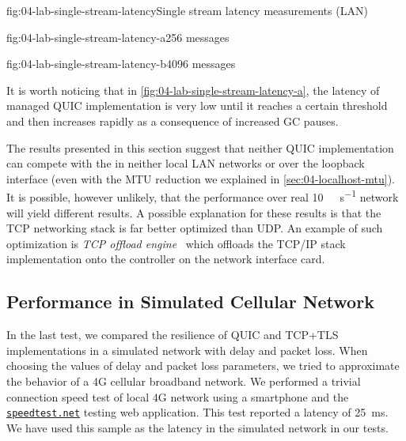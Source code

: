 \begin{myFigure}{fig:04-lab-single-stream-latency}{Single stream latency measurements (LAN)}
\begin{mySubfigure}{0.49\linewidth}{fig:04-lab-single-stream-latency-a}{\SI{256}{\byte} messages}
\footnotesize

\end{mySubfigure}
\begin{mySubfigure}{0.49\linewidth}{fig:04-lab-single-stream-latency-b}{\SI{4096}{\byte} messages}
\footnotesize

\end{mySubfigure}
\end{myFigure}

It is worth noticing that in \autoref{fig:04-lab-single-stream-latency-a}, the latency of managed QUIC
implementation is very low until it reaches a certain threshold and then increases rapidly as a
consequence of increased GC pauses.

The results presented in this section suggest that neither QUIC implementation can compete with the
\SslStream{} in neither local LAN networks or over the loopback interface (even with the MTU
reduction we explained in \autoref{sec:04-localhost-mtu}). It is possible, however unlikely, that
the performance over real \SI[per-mode=symbol]{10}{\giga\bit\per\second} network will yield
different results. A possible explanation for these results is that the TCP networking stack is far
better optimized than UDP\@. An example of such optimization is \textit{TCP offload
  engine}~\cite{wiki:tcp-offload-engine} which offloads the TCP/IP stack implementation onto the
controller on the network interface card.

\subsection{Performance in Simulated Cellular Network}

In the last test, we compared the resilience of QUIC and TCP+TLS implementations in a simulated
network with delay and packet loss. When choosing the values of delay and packet loss parameters, we
tried to approximate the behavior of a 4G cellular broadband network. We performed a trivial
connection speed test of local 4G network using a smartphone and the
\href{https://speedtest.net}{\texttt{speedtest.net}} testing web application. This test reported a
latency of \SI{25}{\milli\second}. We have used this sample as the latency in the simulated network
in our tests.

